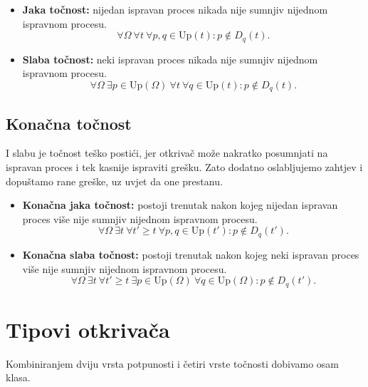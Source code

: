 \documentclass[11pt,a4paper]{article}
\newcommand{\Up}{\mathrm{Up}}
\begin{document}
\begin{itemize}
  \item \textbf{Jaka točnost:} nijedan ispravan proces nikada nije sumnjiv
  nijednom ispravnom procesu.
  \[
    \forall \Omega\ \forall t\ \forall p,q \in \Up(t) : p \notin D_q(t).
  \]
  \item \textbf{Slaba točnost:} neki ispravan proces nikada nije sumnjiv nijednom
  ispravnom procesu.
  \[
    \forall \Omega\ \exists p \in \Up(\Omega)\ \forall t\ \forall q \in \Up(t) :
    p \notin D_q(t).
  \]
\end{itemize}

\subsection*{Konačna točnost}

I slabu je točnost teško postići, jer otkrivač može nakratko posumnjati na
ispravan proces i tek kasnije ispraviti grešku. Zato dodatno oslabljujemo zahtjev
i dopuštamo rane greške, uz uvjet da one prestanu.

\begin{itemize}
  \item \textbf{Konačna jaka točnost:} postoji trenutak nakon kojeg nijedan
  ispravan proces više nije sumnjiv nijednom ispravnom procesu.
  \[
    \forall \Omega\ \exists t\ \forall t' \ge t\ \forall p,q \in \Up(t') :
    p \notin D_q(t').
  \]
  \item \textbf{Konačna slaba točnost:} postoji trenutak nakon kojeg neki ispravan
  proces više nije sumnjiv nijednom ispravnom procesu.
  \[
    \forall \Omega\ \exists t\ \forall t' \ge t\ \exists p \in \Up(\Omega)\
    \forall q \in \Up(\Omega) : p \notin D_q(t').
  \]
\end{itemize}

\section{Tipovi otkrivača}

Kombiniranjem dviju vrsta potpunosti i četiri vrste točnosti dobivamo osam klasa.
\end{document}
